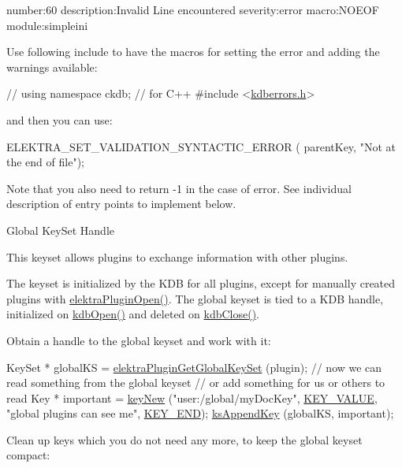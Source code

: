 \begin{DoxyCodeInclude}
number:60
description:Invalid Line encountered
severity:error
macro:NOEOF
module:simpleini
\end{DoxyCodeInclude}
 Use following include to have the macros for setting the error and adding the warnings available\+:


\begin{DoxyCodeInclude}
\textcolor{comment}{// using namespace ckdb; // for C++}
\textcolor{preprocessor}{#include <\hyperlink{kdberrors_8h}{kdberrors.h}>}
\end{DoxyCodeInclude}
 and then you can use\+:


\begin{DoxyCodeInclude}
ELEKTRA\_SET\_VALIDATION\_SYNTACTIC\_ERROR ( parentKey, \textcolor{stringliteral}{"Not at the end of file"});
\end{DoxyCodeInclude}
 Note that you also need to return -\/1 in the case of error. See individual description of entry points to implement below.

\begin{DoxyParagraph}{Global Key\+Set Handle}

\end{DoxyParagraph}
This keyset allows plugins to exchange information with other plugins.

The keyset is initialized by the K\+DB for all plugins, except for manually created plugins with {\ttfamily \hyperlink{elektra_2plugin_8c_a32a70a7876542c51d153164ac5108a57}{elektra\+Plugin\+Open()}}. The global keyset is tied to a K\+DB handle, initialized on {\ttfamily \hyperlink{group__kdb_ga6808defe5870f328dd17910aacbdc6ca}{kdb\+Open()}} and deleted on {\ttfamily \hyperlink{group__kdb_gadb54dc9fda17ee07deb9444df745c96f}{kdb\+Close()}}.

Obtain a handle to the global keyset and work with it\+:


\begin{DoxyCodeInclude}
        KeySet * globalKS = \hyperlink{group__plugin_ga436cda13ed70c0face08661a90620bf6}{elektraPluginGetGlobalKeySet} (plugin);
        \textcolor{comment}{// now we can read something from the global keyset}
        \textcolor{comment}{// or add something for us or others to read}
        Key * important = \hyperlink{group__key_gad23c65b44bf48d773759e1f9a4d43b89}{keyNew} (\textcolor{stringliteral}{"user:/global/myDocKey"}, \hyperlink{group__key_gga9b703ca49f48b482def322b77d3e6bc8ac66e4a49d09212b79f5754ca6db5bd2e}{KEY\_VALUE}, \textcolor{stringliteral}{"global plugins can
       see me"}, \hyperlink{group__key_gga9b703ca49f48b482def322b77d3e6bc8aa8adb6fcb92dec58fb19410eacfdd403}{KEY\_END});
        \hyperlink{group__keyset_gaa5a1d467a4d71041edce68ea7748ce45}{ksAppendKey} (globalKS, important);
\end{DoxyCodeInclude}
 Clean up keys which you do not need any more, to keep the global keyset compact\+:


